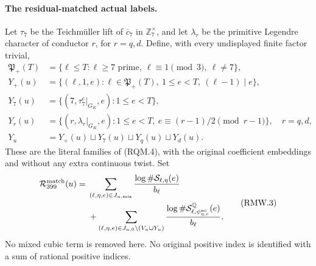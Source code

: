 \paragraph{The residual-matched actual labels.}
Let $\tau_7$ be the Teichm\"uller lift of $\overline c_7$ in
$\mathbb Z_7^\times$, and let $\lambda_r$ be the primitive
Legendre character of conductor $r$, for $r=q,d$.
Define, with every undisplayed finite factor trivial,
\[
 \begin{aligned}
 \mathfrak P_+(T)&=\{\ell\leq T:\ell\geq7\text{ prime},\
                    \ell\equiv1\pmod3,\ \ell\ne7\},\\
 Y_+(u)&=\{(\ell,1,e):\ell\in\mathfrak P_+(T),\
                       1\leq e<T,\ (\ell-1)\mid e\},\\
 Y_7(u)&=\{(7,\tau_7^e|_{G_K},e):1\leq e<T\},\\
 Y_r(u)&=\{(r,\lambda_r|_{G_K},e):1\leq e<T,\
                   e\equiv(r-1)/2\pmod{r-1}\},\quad r=q,d,\\
 Y_u&=Y_+(u)\sqcup Y_7(u)\sqcup Y_q(u)\sqcup Y_d(u).
 \end{aligned}\tag{RMW.2}
\]
These are the literal families of (RQM.4), with the original
coefficient embeddings and without any extra continuous twist.
Set
\[
 \begin{split}
 \mathcal R_{399}^{\rm match}(u)={}&
 \sum_{(\ell,\eta,e)\in J_{u,\rm mix}}
                  \frac{\log\#\mathcal S_{\ell,\eta}(e)}{b_\ell}\\
 &+\sum_{(\ell,\eta,e)\in J_{u,0}\setminus(V_u\cup Y_u)}
       \frac{\log\#\mathcal S^{\mathbb Q}_{\ell,
                              \psi_{\eta,e}^{\rm nc}}(e)}{b_\ell}.
 \end{split}\tag{RMW.3}
\]
No mixed cubic term is removed here. No original positive index
is identified with a sum of rational positive indices.

